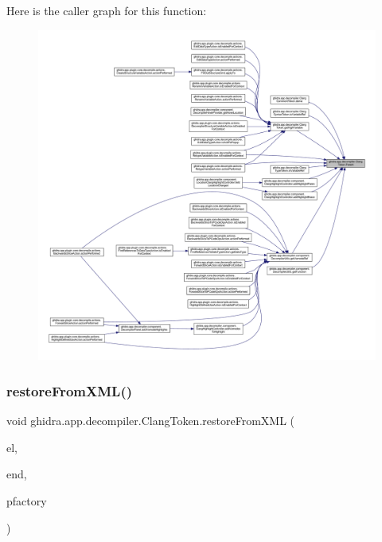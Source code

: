 Here is the caller graph for this function\+:
\nopagebreak
\begin{figure}[H]
\begin{center}
\leavevmode
\includegraphics[width=350pt]{classghidra_1_1app_1_1decompiler_1_1_clang_token_ae1b89249984d1228998b6fe8ed8c67b9_icgraph}
\end{center}
\end{figure}
\mbox{\label{classghidra_1_1app_1_1decompiler_1_1_clang_token_a3236274b52425653a2986ada2874fa99}} 
\subsubsection{\texorpdfstring{restoreFromXML()}{restoreFromXML()}}
{\footnotesize\ttfamily void ghidra.\+app.\+decompiler.\+Clang\+Token.\+restore\+From\+X\+ML (\begin{DoxyParamCaption}\item[{Xml\+Element}]{el,  }\item[{Xml\+Element}]{end,  }\item[{Pcode\+Factory}]{pfactory }\end{DoxyParamCaption})\hspace{0.3cm}{\ttfamily [inline]}}



